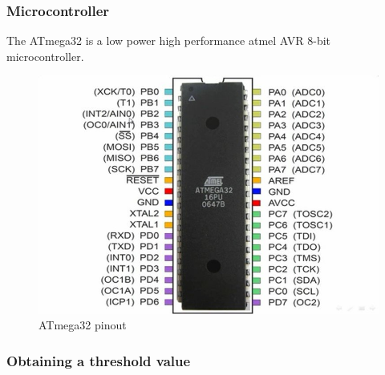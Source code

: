 \documentclass[12pt]{article}
\begin{document}
	\subsubsection{Microcontroller}
	The ATmega32 is a low power high performance atmel AVR 8-bit microcontroller.
			\begin{figure}[!htbp]
				\centering
				\includegraphics[scale = 1]{atmega32.jpg}
				\caption{ATmega32 pinout}
			\end{figure}
	
		
	\subsubsection{Obtaining a threshold value}
	\label{sec:4.3.2}
			
\end{document}
